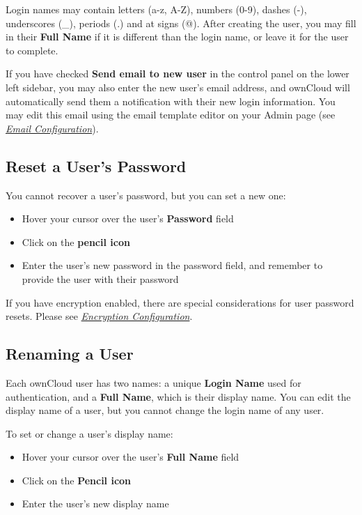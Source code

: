 \documentclass[letterpaper,10pt,english]{sphinxmanual}
\begin{document}
Login names may contain letters (a-z, A-Z), numbers (0-9), dashes (-),
underscores (\_), periods (.) and at signs (@). After creating the user, you
may fill in their \textbf{Full Name} if it is different than the login name, or
leave it for the user to complete.

If you have checked \textbf{Send email to new user} in the control panel on the
lower left sidebar, you may also enter the new user's email address, and
ownCloud will automatically send them a notification with their new login
information. You may edit this email using the email template editor on your
Admin page (see {\hyperref[configuration_server/email_configuration::doc]{\emph{\emph{Email Configuration}}}}).


\subsection{Reset a User's Password}
\label{configuration_user/user_configuration:reset-a-user-s-password}
You cannot recover a user's password, but you can set a new one:
\begin{itemize}
\item {} 
Hover your cursor over the user's \textbf{Password} field

\item {} 
Click on the \textbf{pencil icon}

\item {} 
Enter the user's new password in the password field, and remember to provide
the user with their password

\end{itemize}

If you have encryption enabled, there are special considerations for user
password resets. Please see
{\hyperref[configuration_files/encryption_configuration::doc]{\emph{\emph{Encryption Configuration}}}}.


\subsection{Renaming a User}
\label{configuration_user/user_configuration:renaming-a-user}
Each ownCloud user has two names: a unique \textbf{Login Name} used for
authentication, and a \textbf{Full Name}, which is their display name. You can edit
the display name of a user, but you cannot change the login name of any user.

To set or change a user's display name:
\begin{itemize}
\item {} 
Hover your cursor over the user's \textbf{Full Name} field

\item {} 
Click on the \textbf{Pencil icon}

\item {} 
Enter the user's new display name

\end{itemize}
\end{document}
